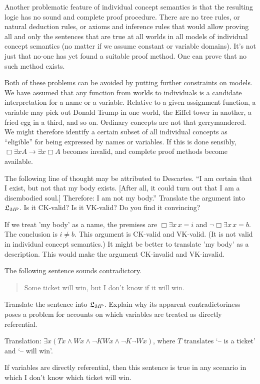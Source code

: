 Another problematic feature of individual concept semantics is that the
resulting logic has no sound and complete proof procedure. There are no tree
rules, or natural deduction rules, or axioms and inference rules that would
allow proving all and only the sentences that are true at all worlds in all
models of individual concept semantics (no matter if we assume constant or
variable domains). It's not just that no-one has yet found a suitable proof
method. One can prove that no such method exists.

Both of these problems can be avoided by putting further constraints on models.
We have assumed that any function from worlds to individuals is a candidate
interpretation for a name or a variable. Relative to a given assignment
function, a variable may pick out Donald Trump in one world, the Eiffel tower in
another, a fried egg in a third, and so on. Ordinary concepts are not that
gerrymandered. We might therefore identify a certain subset of all individual
concepts as ``eligible'' for being expressed by names or variables. If this is
done sensibly, $\Box \exists x A \to \exists x \Box A$ becomes invalid, and
complete proof methods become available.

\begin{exercise}
  The following line of thought may be attributed to Descartes. ``I am certain
  that I exist, but not that my body exists. [After all, it could turn out that
  I am a disembodied soul.] Therefore: I am not my body.'' Translate the
  argument into $\mathfrak{L}_{M\!P}$. Is it CK-valid? Is it VK-valid? Do you find it
  convincing?
\end{exercise}
\begin{solution}
  If we treat 'my body' as a name, the premises are $\Box \exists x\, x\!=\!i$ and
  $\neg\Box \exists x\, x\!=\!b$. The conclusion is $i\!\not=\!b$. This argument
  is CK-valid and VK-valid. (It is not valid in individual concept semantics.)
  It might be better to translate 'my body' as a description. This would make the argument CK-invalid and VK-invalid. 
\end{solution}

\begin{exercise}
  The following sentence sounds contradictory.
  \begin{quote}
    Some ticket will win, but I don't know if it will win.
  \end{quote}
  Translate the sentence into $\mathfrak{L}_{M\!P}$. Explain why its apparent
  contradictoriness poses a problem for accounts on which variables are treated
  as directly referential.
\end{exercise}
\begin{solution}
  Translation: $\exists x (Tx \land Wx \land \neg K Wx \land \neg K \neg Wx)$,
  where $T$ translates `-- is a ticket' and `-- will win'.

  If variables are directly referential, then this sentence is true in any
  scenario in which I don't know which ticket will win.
\end{solution}

